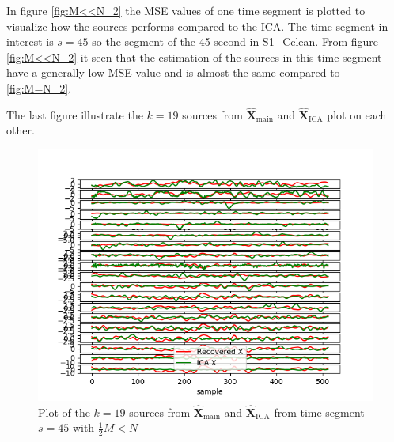 In figure \ref{fig:M<<N_2} the MSE values of one time segment is plotted to visualize how the sources performs compared to the ICA. The time segment in interest is $s = 45$ so the segment of the 45 second in S1\_Cclean. 
From figure \ref{fig:M<<N_2} it seen that the estimation of the sources in this time segment have a generally low MSE value and is almost the same compared to \ref{fig:M=N_2}. 

The last figure illustrate the $k = 19$ sources from $\hat{\mathbf{X}}_{\text{main}}$ and $\hat{\mathbf{X}}_{\text{ICA}}$ plot on each other.
\begin{figure}[H]
    \centering
	\includegraphics[scale=0.5]{figures/ch_7/Sources_2M_N.png}
	\caption{Plot of the $k = 19$ sources from $\hat{\mathbf{X}}_{\text{main}}$ and $\hat{\mathbf{X}}_{\text{ICA}}$ from time segment $s = 45$ with $\frac{1}{2} M<N$}
	\label{fig:M<<N_3}
\end{figure} 
\noindent
